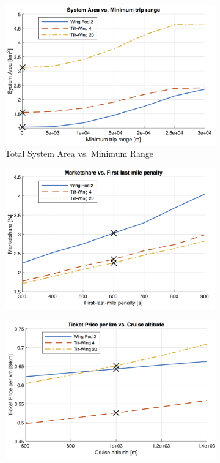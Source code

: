 \begin{figure}[h]
\begin{subfigure}[t]{0.33\textwidth}
    \centering
    \includegraphics[width=\textwidth]{Figures/report_sys_area.png}
    \captionsetup{justification=centering}
    \caption{Total System Area vs. Minimum Range}
    \label{fig:sens1}
\end{subfigure}
\begin{subfigure}[t]{0.33\textwidth}
    \centering
    \includegraphics[width=\textwidth]{Figures/report_marketshare.png}
    \captionsetup{justification=centering}
    \caption{}
    \label{fig:sens2}
\end{subfigure}
\begin{subfigure}[t]{0.33\textwidth}
    \centering
    \includegraphics[width=\textwidth]{Figures/Alt_TPrice_perkmNOPAD.png}

\end{subfigure}
\end{figure}
